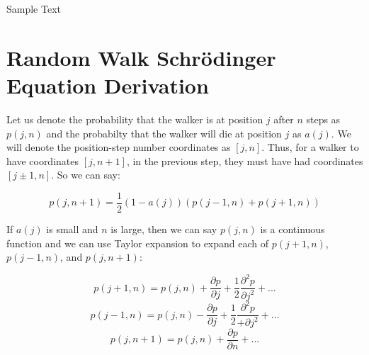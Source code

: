 \documentclass[journal]{IEEEtran}
\begin{document}
Sample Text



%



\appendices
\section{Random Walk Schr\"{o}dinger Equation Derivation}
\label{appendix:derivation}
Let us denote the probability that the walker is at position $j$ after $n$ steps
as $p(j,n)$ and the probabilty that the walker will die at position $j$ as
$a(j)$. We will denote the position-step number coordinates as $[j, n]$. Thus,
for a walker to have coordinates $[j, n+1]$, in the previous step, they must have
had coordinates $[j \pm 1, n]$. So we can say:

\begin{equation}
  \label{eq:probability}
  p(j, n+1) =  \frac{1}{2}(1-a(j))(p(j-1,n) + p(j+1,n))
\end{equation}

If $a(j)$ is small and $n$ is large, then we can say $p(j, n)$ is a continuous
function and we can use Taylor expansion to expand each of $p(j+1, n)$,
$p(j-1,n)$, and $p(j, n+1)$:

\begin{equation}
  p(j+1, n) = p(j,n) + \frac{\partial p}{\partial j} + \frac{1}{2}
  \frac{\partial^2 p}{\partial j^2} + ...
  \nonumber
\end{equation}
\begin{equation}
  p(j-1, n) = p(j,n) - \frac{\partial p}{\partial j} + \frac{1}{2}
  \frac{\partial^2 p}{+\partial j^2} + ...
  \nonumber
\end{equation}
\begin{equation}
  p(j, n+1) = p(j, n) + \frac{\partial p}{\partial n} + ...
  \nonumber
\end{equation}
\end{document}
